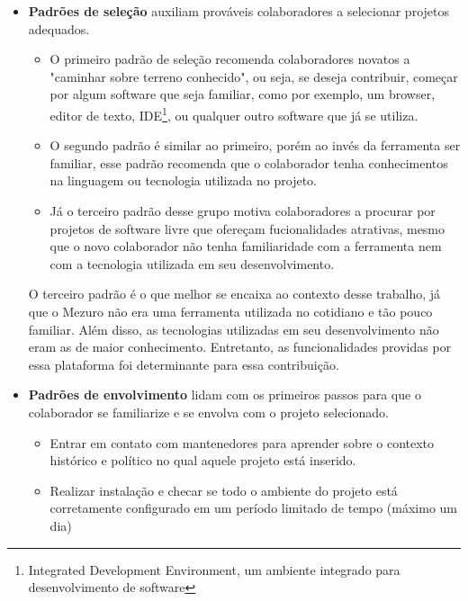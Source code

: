 \begin{itemize}

	\item \textbf{Padrões de seleção} auxiliam prováveis colaboradores a selecionar projetos adequados.

		\begin{itemize}

			\item O primeiro padrão de seleção recomenda colaboradores novatos a "caminhar sobre terreno conhecido", ou seja, se deseja contribuir, começar por algum software que seja familiar, como por exemplo, um browser, editor de texto, IDE\footnote{Integrated Development Environment, um ambiente integrado para desenvolvimento de software}, ou qualquer outro software que já se utiliza.

			\item O segundo padrão é similar ao primeiro, porém ao invés da ferramenta ser familiar, esse padrão recomenda que o colaborador tenha conhecimentos na linguagem ou tecnologia utilizada no projeto.

			\item Já o terceiro padrão desse grupo motiva colaboradores a procurar por projetos de software livre que ofereçam fucionalidades atrativas, mesmo que o novo colaborador não tenha familiaridade com a ferramenta nem com a tecnologia utilizada em seu desenvolvimento.
		\end{itemize}

O terceiro padrão é o que melhor se encaixa ao contexto desse trabalho, já que o Mezuro não era uma ferramenta utilizada no cotidiano e tão pouco familiar. Além disso, as tecnologias utilizadas em seu desenvolvimento não eram as de maior conhecimento. Entretanto, as funcionalidades providas por essa plataforma foi determinante para essa contribuição.

	\item \textbf{Padrões de envolvimento} lidam com os primeiros passos para que o colaborador se familiarize e se envolva com o projeto selecionado.

		\begin{itemize}
			\item Entrar em contato com mantenedores para aprender sobre o contexto 	histórico e político no qual aquele projeto está inserido.

			\item Realizar instalação e checar se todo o ambiente do projeto está 	corretamente configurado em um período limitado de tempo (máximo um dia)


\end{itemize}
\end{itemize}
